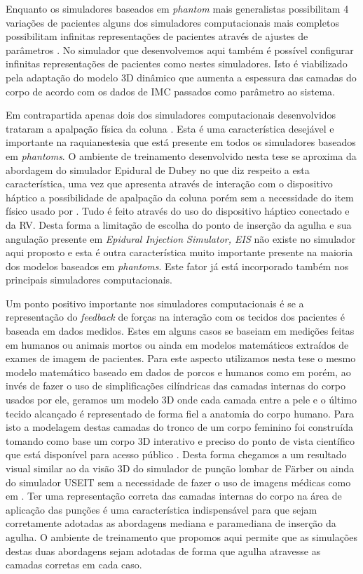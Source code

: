 Enquanto os simuladores baseados em \textit{phantom} mais generalistas possibilitam 4 variações de pacientes alguns dos simuladores computacionais mais completos possibilitam infinitas representações de pacientes através de ajustes de parâmetros \cite{Stredney1996, Wilson2003, N.2013, Brazil2017}. No simulador que desenvolvemos aqui também é possível configurar infinitas representações de pacientes como nestes simuladores. Isto é viabilizado pela adaptação do modelo 3D dinâmico que aumenta a espessura das camadas do corpo de acordo com os dados de \acrshort{IMC} passados como parâmetro ao sistema.  

Em contrapartida apenas dois dos simuladores computacionais desenvolvidos trataram a apalpação física da coluna \cite{Wilson2003, N.2013}. Esta é uma característica desejável e importante na raquianestesia que está presente em todos os simuladores baseados em \textit{phantoms}. O ambiente de treinamento desenvolvido nesta tese se aproxima da abordagem do simulador Epidural de Dubey \cite{N.2013} no que diz respeito a esta característica, uma vez que apresenta através de interação com o dispositivo háptico a possibilidade de apalpação da coluna porém sem a necessidade do item físico usado por \textcite{Wilson2003}. Tudo é feito através do uso do dispositivo háptico conectado e da \acrshort{RV}. Desta forma a limitação de escolha do ponto de inserção da agulha e sua angulação presente em \textit{Epidural Injection Simulator, EIS} \cite{Wilson2003} não existe no simulador aqui proposto e esta é outra característica muito importante presente na maioria dos modelos baseados em \textit{phantoms}. Este fator já está incorporado também nos principais simuladores computacionais.

Um ponto positivo importante nos simuladores computacionais é se a representação do \textit{feedback} de forças na interação com os tecidos dos pacientes é baseada em dados medidos. Estes em alguns casos se baseiam em medições feitas em humanos ou animais mortos ou ainda em modelos matemáticos extraídos de exames de imagem de pacientes. Para este aspecto utilizamos nesta tese o mesmo modelo matemático baseado em dados de porcos e humanos como em \textcite{Brazil2017} porém, ao invés de fazer o uso de simplificações cilíndricas das camadas internas do corpo usados por ele, geramos um modelo 3D onde cada camada entre a pele e o último tecido alcançado é representado de forma fiel a anatomia do corpo humano. Para isto a modelagem destas camadas do tronco de um corpo feminino foi construída tomando como base um corpo 3D interativo e preciso do ponto de vista científico que está disponível para acesso público \cite{BioDigitalInc2019}. Desta forma chegamos a um resultado visual similar ao da visão 3D do simulador de punção lombar de Färber ou ainda do simulador USEIT sem a necessidade de fazer o uso de imagens médicas como em \textcite{Farber2009}. Ter uma representação correta das camadas internas do corpo na área de aplicação das punções é uma característica indispensável para que sejam corretamente adotadas as abordagens mediana e paramediana de inserção da agulha. O ambiente de treinamento que propomos aqui permite que as simulações destas duas abordagens sejam adotadas de forma que agulha atravesse as camadas corretas em cada caso. 

